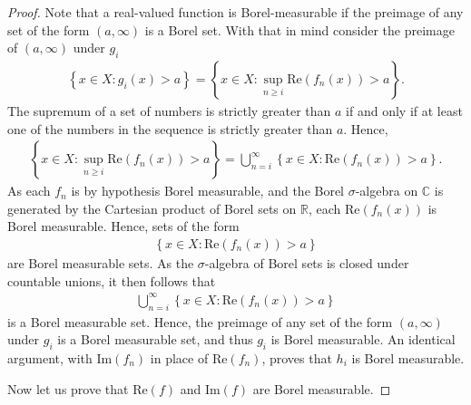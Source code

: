 \begin{proof}
Note that a real-valued function is Borel-measurable if the preimage of any set of the form $(a, \infty)$ is a Borel set. With that in mind consider the preimage of $(a, \infty)$ under $g_i$
\begin{align}
    \left\{ x \in X : g_i(x) > a \right\} = \left\{ x \in X : \sup\limits_{n \ge i} \text{Re}(f_n(x)) > a \right\}.
\end{align}
The supremum of a set of numbers is strictly greater than $a$ if and only if at least one of the numbers in the sequence is strictly greater than $a$. Hence,
\begin{align}
    \left\{ x \in X : \sup\limits_{n \ge i} \text{Re}(f_n(x)) > a \right\} = \bigcup_{n=i}^\infty  \left\{ x \in X : \text{Re}( f_n(x) ) > a \right\}.
\end{align}
As each $f_n$ is by hypothesis Borel measurable, and the Borel $\sigma$-algebra on $\mathbb{C}$ is generated by the Cartesian product of Borel sets on $\mathbb{R}$, each $\text{Re}( f_n(x) )$ is Borel measurable. Hence, sets of the form
\begin{align}
    \left\{ x \in X : \text{Re}( f_n(x) ) > a \right\}
\end{align}
are Borel measurable sets. As the $\sigma$-algebra of Borel sets is closed under countable unions, it then follows that
\begin{align}
    \bigcup_{n=i}^\infty  \left\{ x \in X : \text{Re}( f_n(x) ) > a \right\}
\end{align}
is a Borel measurable set. Hence, the preimage of any set of the form $(a, \infty)$ under $g_i$ is a Borel measurable set, and thus $g_i$ is Borel measurable. An identical argument, with $\text{Im}(f_n)$ in place of $\text{Re}(f_n)$, proves that $h_i$ is Borel measurable.

Now let us prove that $\text{Re}(f)$ and $\text{Im}(f)$ are Borel measurable.


\end{proof}
